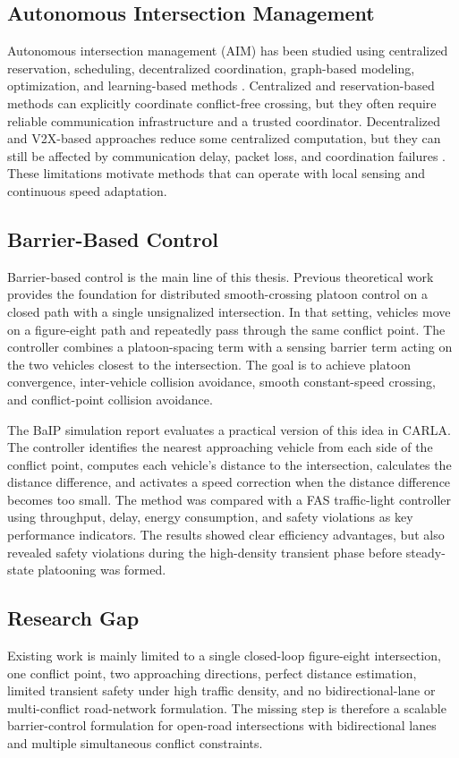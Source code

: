 \documentclass[conference]{IEEEtran}
\begin{document}
\subsection{Autonomous Intersection Management}
Autonomous intersection management (AIM) has been studied using centralized reservation, scheduling, decentralized coordination, graph-based modeling, optimization, and learning-based methods \cite{dresner2008,khayatian2020,lin2019,guney2020}. Centralized and reservation-based methods can explicitly coordinate conflict-free crossing, but they often require reliable communication infrastructure and a trusted coordinator. Decentralized and V2X-based approaches reduce some centralized computation, but they can still be affected by communication delay, packet loss, and coordination failures \cite{guan2020,wu2019}. These limitations motivate methods that can operate with local sensing and continuous speed adaptation.

\subsection{Barrier-Based Control}
Barrier-based control is the main line of this thesis. Previous theoretical work provides the foundation for distributed smooth-crossing platoon control on a closed path with a single unsignalized intersection. In that setting, vehicles move on a figure-eight path and repeatedly pass through the same conflict point. The controller combines a platoon-spacing term with a sensing barrier term acting on the two vehicles closest to the intersection. The goal is to achieve platoon convergence, inter-vehicle collision avoidance, smooth constant-speed crossing, and conflict-point collision avoidance.

The BaIP simulation report evaluates a practical version of this idea in CARLA. The controller identifies the nearest approaching vehicle from each side of the conflict point, computes each vehicle's distance to the intersection, calculates the distance difference, and activates a speed correction when the distance difference becomes too small. The method was compared with a FAS traffic-light controller using throughput, delay, energy consumption, and safety violations as key performance indicators. The results showed clear efficiency advantages, but also revealed safety violations during the high-density transient phase before steady-state platooning was formed.

\subsection{Research Gap}
Existing work is mainly limited to a single closed-loop figure-eight intersection, one conflict point, two approaching directions, perfect distance estimation, limited transient safety under high traffic density, and no bidirectional-lane or multi-conflict road-network formulation. The missing step is therefore a scalable barrier-control formulation for open-road intersections with bidirectional lanes and multiple simultaneous conflict constraints.
\end{document}
